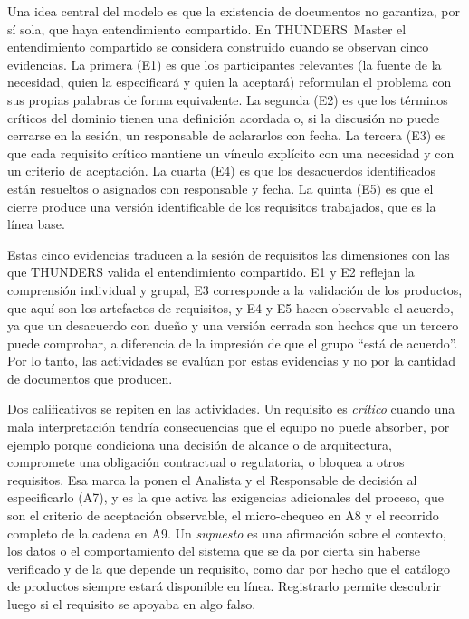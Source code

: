 \documentclass[12pt,letterpaper,oneside]{report}
\begin{document}
Una idea central del modelo es que la existencia de documentos no garantiza,
por sí sola, que haya entendimiento compartido. En THUNDERS~Master el
entendimiento compartido se considera construido cuando se observan cinco evidencias. La
primera (E1) es que los participantes relevantes (la fuente de la necesidad,
quien la especificará y quien la aceptará) reformulan el problema con
sus propias palabras de forma equivalente. La segunda (E2) es que los términos
críticos del dominio tienen una definición acordada o, si la discusión no puede
cerrarse en la sesión, un responsable de aclararlos con fecha. La tercera (E3)
es que cada requisito crítico mantiene un vínculo explícito con una necesidad y
con un criterio de aceptación. La cuarta (E4) es que los desacuerdos
identificados están resueltos o asignados con responsable y fecha. La quinta
(E5) es que el cierre produce una versión identificable de los requisitos
trabajados, que es la línea base.

Estas cinco evidencias traducen a la sesión de requisitos las dimensiones con
las que THUNDERS valida el entendimiento compartido. E1 y E2 reflejan la
comprensión individual y grupal, E3 corresponde a la validación de los
productos, que aquí son los artefactos de requisitos, y E4 y E5 hacen
observable el acuerdo, ya que un desacuerdo con dueño y una versión cerrada son
hechos que un tercero puede comprobar, a diferencia de la impresión de que el
grupo ``está de acuerdo''. Por lo tanto, las actividades se evalúan por estas
evidencias y no por la cantidad de documentos que producen.

Dos calificativos se repiten en las actividades. Un requisito es \emph{crítico}
cuando una mala interpretación tendría consecuencias que el equipo no puede
absorber, por ejemplo porque condiciona una decisión de alcance o de
arquitectura, compromete una obligación contractual o regulatoria, o bloquea a
otros requisitos. Esa marca la ponen el Analista y el Responsable de decisión al
especificarlo (A7), y es la que activa las exigencias adicionales del proceso,
que son el criterio de aceptación observable, el micro-chequeo en A8 y el
recorrido completo de la cadena en A9. Un \emph{supuesto} es una afirmación sobre el contexto, los
datos o el comportamiento del sistema que se da por cierta sin haberse
verificado y de la que depende un requisito, como dar por hecho que el catálogo
de productos siempre estará disponible en línea. Registrarlo permite descubrir
luego si el requisito se apoyaba en algo falso.
\end{document}
